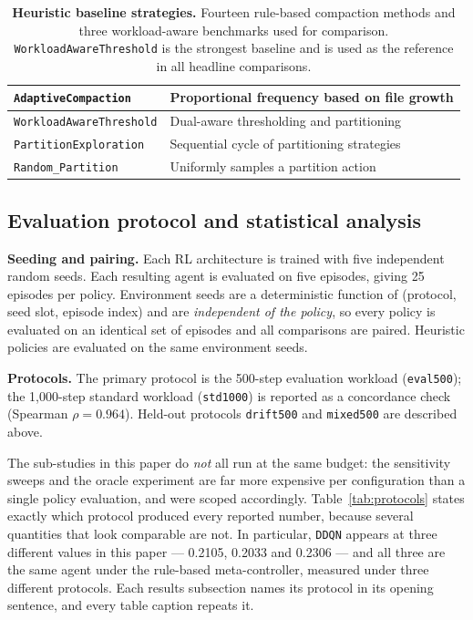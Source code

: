 \documentclass[fleqn,10pt]{wlscirep}
\newcommand{\ddqn}{\texttt{DDQN}}
\begin{document}
\begin{table}[!htbp]
\begin{tabular}{lp{8cm}}
\texttt{AdaptiveCompaction}       & Proportional frequency based on file growth \\
\midrule
\texttt{WorkloadAwareThreshold}   & Dual-aware thresholding and partitioning \\
\texttt{PartitionExploration}     & Sequential cycle of partitioning strategies \\
\texttt{Random\_Partition}        & Uniformly samples a partition action \\
\bottomrule
\end{tabular}
\caption{\label{tab:baselines}\textbf{Heuristic baseline strategies.}
  Fourteen rule-based compaction methods and three workload-aware
  benchmarks used for comparison. \texttt{WorkloadAwareThreshold} is the
  strongest baseline and is used as the reference in all headline
  comparisons.}
\end{table}

\FloatBarrier

\subsection*{Evaluation protocol and statistical analysis}

\textbf{Seeding and pairing.}
Each RL architecture is trained with five independent random seeds. Each
resulting agent is evaluated on five episodes, giving 25 episodes per
policy. Environment seeds are a deterministic function of (protocol,
seed slot, episode index) and are \emph{independent of the policy}, so
every policy is evaluated on an identical set of episodes and all
comparisons are paired. Heuristic policies are evaluated on the same
environment seeds.

\textbf{Protocols.}
The primary protocol is the 500-step evaluation workload
(\texttt{eval500}); the 1{,}000-step standard workload (\texttt{std1000})
is reported as a concordance check (Spearman $\rho = 0.964$). Held-out
protocols \texttt{drift500} and \texttt{mixed500} are described above.

The sub-studies in this paper do \emph{not} all run at the same budget:
the sensitivity sweeps and the oracle experiment are far more expensive
per configuration than a single policy evaluation, and were scoped
accordingly. Table~\ref{tab:protocols} states exactly which protocol
produced every reported number, because several quantities that look
comparable are not. In particular, \ddqn{} appears at three different
values in this paper --- 0.2105, 0.2033 and 0.2306 --- and all three are
the same agent under the rule-based meta-controller, measured under
three different protocols. Each results subsection names its protocol in
its opening sentence, and every table caption repeats it.
\end{document}
